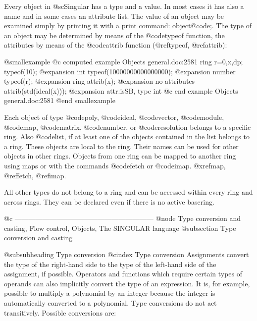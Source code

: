 {{{Every object in @sc{Singular} has a type and a value.  In most cases it
has also a name and in some cases an attribute list.  The value of an
object may be examined simply by printing it with a print command:
object@code{;}.  The type of an object may be determined by means of the
@code{typeof} function, the attributes by means of the @code{attrib}
function (@ref{typeof}, @ref{attrib}):

@smallexample
@c computed example Objects general.doc:2581 
  ring r=0,x,dp;
  typeof(10);
@expansion{} int
  typeof(10000000000000000);
@expansion{} number
  typeof(r);
@expansion{} ring
  attrib(x);
@expansion{} no attributes
  attrib(std(ideal(x)));
@expansion{} attr:isSB, type int
@c end example Objects general.doc:2581
@end smallexample

Each object of type
@code{poly},
@code{ideal},
@code{vector},
@code{module},
@code{map},
@code{matrix},
@code{number}, or
@code{resolution}
belongs to a specific ring.  Also @code{list}, if at least one of the
objects contained in the list belongs to a ring.  These objects are local
to the ring.  Their names can be used for other objects in other rings.
Objects from one ring can be mapped to another ring using maps or with the
commands @code{fetch} or @code{imap}.  @xref{map}, @ref{fetch}, @ref{imap}.

All other types do not belong to a ring and can be accessed within every
ring and across rings.  They can be declared even if there is no active
basering.

@c ------------------------------------------------------------
@node Type conversion and casting, Flow control, Objects, The SINGULAR language
@subsection Type conversion and casting

@subsubheading Type conversion
@cindex Type conversion
Assignments convert the type of the right-hand side to the type of the
left-hand side of the assignment, if possible.  Operators and functions
which require certain types of operands can also implicitly convert the
type of an expression.  It is, for example, possible to multiply a
polynomial by an integer because the integer is automatically converted to
a polynomial.  Type conversions do not act transitively.  Possible
conversions are:


}}}
